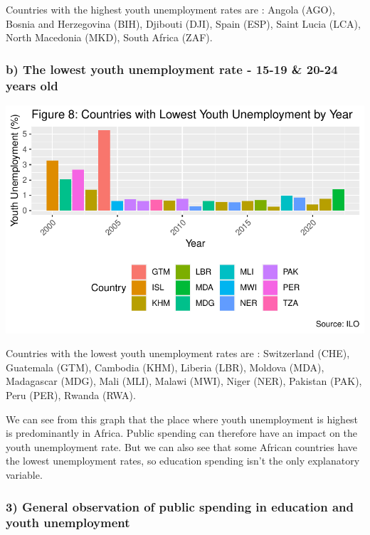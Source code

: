 \documentclass[
  letterpaper,
  DIV=11,
  numbers=noendperiod]{scrartcl}
\begin{document}
Countries with the highest youth unemployment rates are : Angola (AGO),
Bosnia and Herzegovina (BIH), Djibouti (DJI), Spain (ESP), Saint Lucia
(LCA), North Macedonia (MKD), South Africa (ZAF).

\hypertarget{b-the-lowest-youth-unemployment-rate---15-19-20-24-years-old}{%
\subsubsection{b) The lowest youth unemployment rate - 15-19 \& 20-24
years
old}\label{b-the-lowest-youth-unemployment-rate---15-19-20-24-years-old}}

\includegraphics{Projet-BM_files/figure-pdf/unnamed-chunk-16-1.pdf}

Countries with the lowest youth unemployment rates are : Switzerland
(CHE), Guatemala (GTM), Cambodia (KHM), Liberia (LBR), Moldova (MDA),
Madagascar (MDG), Mali (MLI), Malawi (MWI), Niger (NER), Pakistan (PAK),
Peru (PER), Rwanda (RWA).

We can see from this graph that the place where youth unemployment is
highest is predominantly in Africa. Public spending can therefore have
an impact on the youth unemployment rate. But we can also see that some
African countries have the lowest unemployment rates, so education
spending isn't the only explanatory variable.

\hypertarget{general-observation-of-public-spending-in-education-and-youth-unemployment}{%
\subsubsection{3) General observation of public spending in education
and youth
unemployment}\label{general-observation-of-public-spending-in-education-and-youth-unemployment}}
\end{document}
